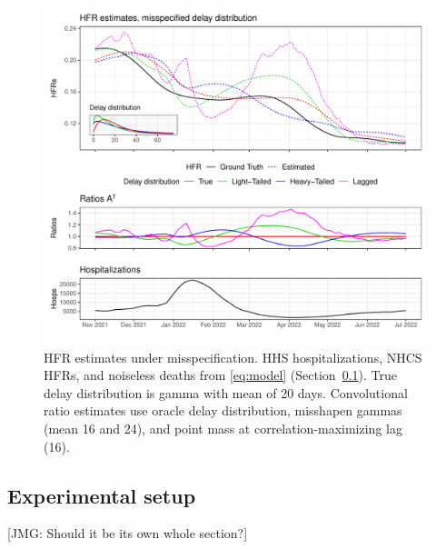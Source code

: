 \documentclass{article}
\newcommand{\djmcomment}[1]{{\color{teal}[DJM: #1]}}
\newcommand{\jmgcomment}[1]{{\color{cyan}[JMG: #1]}}
\begin{document}
\begin{figure}
    \centering
    \includegraphics[width=.8\linewidth]{Figures/Simulated/toy_misp.pdf}
    \caption{HFR estimates under misspecification. HHS hospitalizations, NHCS HFRs, and noiseless deaths from \eqref{eq:model} (Section~\ref{sec:setup}). True delay distribution is gamma with mean of 20 days. 
    Convolutional ratio estimates use oracle delay distribution, misshapen gammas (mean 16 and 24), and point mass at correlation-maximizing lag (16).}%
    \label{fig:misspecified}
\end{figure}



\subsection{Experimental setup}\label{sec:setup}
\jmgcomment{Should it be its own whole section?}
\end{document}
